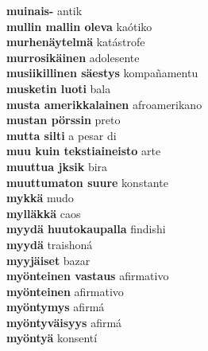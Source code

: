 \textbf{ muinais-  } antik \\
\textbf{ mullin mallin oleva  } kaótiko \\
\textbf{ murhenäytelmä  } katástrofe \\
\textbf{ murrosikäinen  } adolesente \\
\textbf{ musiikillinen säestys  } kompañamentu \\
\textbf{ musketin luoti  } bala \\
\textbf{ musta amerikkalainen  } afroamerikano \\
\textbf{ mustan pörssin  } preto \\
\textbf{ mutta silti  } a pesar di \\
\textbf{ muu kuin tekstiaineisto  } arte \\
\textbf{ muuttua jksik  } bira \\
\textbf{ muuttumaton suure  } konstante \\
\textbf{ mykkä  } mudo \\
\textbf{ mylläkkä  } caos \\
\textbf{ myydä huutokaupalla  } findishi \\
\textbf{ myydä  } traishoná \\
\textbf{ myyjäiset  } bazar \\
\textbf{ myönteinen vastaus  } afirmativo \\
\textbf{ myönteinen  } afirmativo \\
\textbf{ myöntymys  } afirmá \\
\textbf{ myöntyväisyys  } afirmá \\
\textbf{ myöntyä  } konsentí \\

